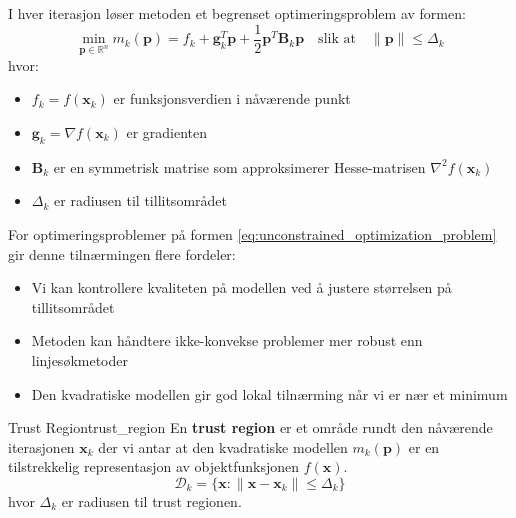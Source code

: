 I hver iterasjon løser metoden et begrenset optimeringsproblem av formen:
\[
	\min_{\symbf{p} \in \mathbb{R}^n} m_k(\symbf{p}) = f_k + \symbf{g}_k^T\symbf{p} + \frac{1}{2}\symbf{p}^T\symbf{B}_k\symbf{p} \quad \text{slik at} \quad \|\symbf{p}\| \leq \Delta_k
\]
hvor:
\begin{itemize}
	\item $f_k = f(\symbf{x}_k)$ er funksjonsverdien i nåværende punkt
	\item $\symbf{g}_k = \nabla f(\symbf{x}_k)$ er gradienten
	\item $\symbf{B}_k$ er en symmetrisk matrise som approksimerer Hesse-matrisen $\nabla^2 f(\symbf{x}_k)$
	\item $\Delta_k$ er radiusen til tillitsområdet
\end{itemize}

For optimeringsproblemer på formen \eqref{eq:unconstrained_optimization_problem} gir denne tilnærmingen flere fordeler:
\begin{itemize}
	\item Vi kan kontrollere kvaliteten på modellen ved å justere størrelsen på tillitsområdet
	\item Metoden kan håndtere ikke-konvekse problemer mer robust enn linjesøkmetoder
	\item Den kvadratiske modellen gir god lokal tilnærming når vi er nær et minimum
\end{itemize}


\begin{definition}{Trust Region}{trust_region}
	En \textbf{trust region} er et område rundt den nåværende iterasjonen \( \symbf{x}_k \) der vi antar at den kvadratiske modellen \( m_k(\symbf{p}) \) er en tilstrekkelig representasjon av objektfunksjonen \( f(\symbf{x}) \).
	\[
		\mathcal{D}_k = \{\symbf{x} : \|\symbf{x} - \symbf{x}_k\| \leq \Delta_k\}
	\]
	hvor \( \Delta_k \) er radiusen til trust regionen.
\end{definition}

